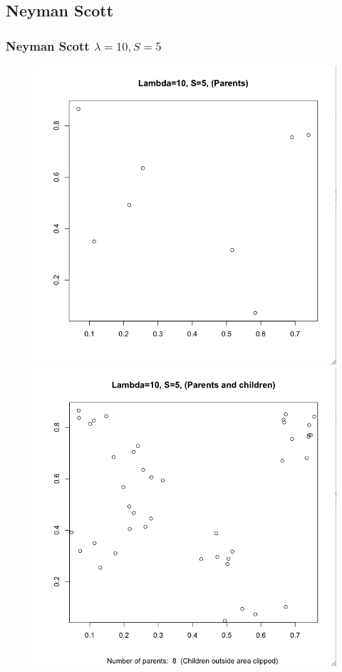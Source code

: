 \documentclass[nototal,handout]{beamer}
\begin{document}
\subsection{Neyman Scott}
\begin{frame}
	\frametitle{Neyman Scott $\lambda=10, S=5$}
 \begin{figure}[ht]
  \begin{minipage}[b]{0.4\linewidth}
  \centering
  \includegraphics[scale=0.20]{ns105p.png}
  \end{minipage}
  \begin{minipage}[b]{0.4\linewidth}
  \centering
  \includegraphics[scale=0.20]{ns105c.png}
  \end{minipage}

  \end{figure}
 \end{frame} 
\end{document}
